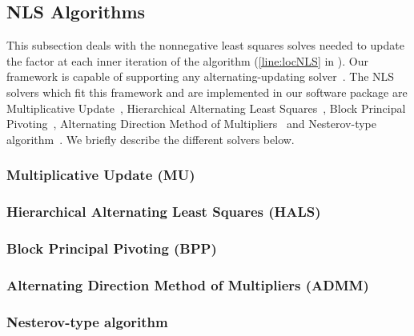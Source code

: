\subsection{NLS Algorithms}
This subsection deals with the nonnegative least squares solves needed to update the factor at each inner iteration of the algorithm (\cref{line:locNLS} in ). Our framework is capable of supporting any alternating-updating solver~\cite{KBP16}. The NLS solvers which fit this framework and are implemented in our software package are Multiplicative Update~\cite{LS99}, Hierarchical Alternating Least Squares~\cite{CP2009}, Block Principal Pivoting~\cite{KP2011}, Alternating Direction Method of Multipliers~\cite{HSL2016} and Nesterov-type algorithm~\cite{LKLHS2017}. We briefly describe the different solvers below.

\subsubsection{Multiplicative Update (MU)}
\subsubsection{Hierarchical Alternating Least Squares (HALS)}
\subsubsection{Block Principal Pivoting (BPP)}
\subsubsection{Alternating Direction Method of Multipliers (ADMM)}
\subsubsection{Nesterov-type algorithm}
